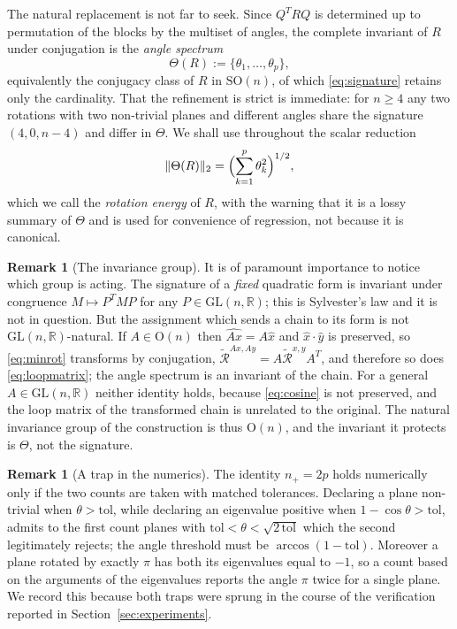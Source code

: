 \documentclass{article}
\theoremstyle{plain}
\theoremstyle{definition}
\newtheorem{remark}[theorem]{Remark}
\numberwithin{equation}{section}
\newcommand{\R}{\mathbb{R}}
\newcommand{\SO}{\mathrm{SO}}
\newcommand{\Ort}{\mathrm{O}}
\newcommand{\Rmin}{\widetilde{\mathcal{R}}}
\begin{document}
The natural replacement is not far to seek. Since $Q^T R Q$ is
determined up to permutation of the blocks by the multiset of angles,
the complete invariant of $R$ under conjugation is the \emph{angle
spectrum}
\begin{equation}\label{eq:anglespectrum}
\Theta(R) := \{\theta_1,\dots,\theta_p\},
\end{equation}
equivalently the conjugacy class of $R$ in $\SO(n)$, of which
\eqref{eq:signature} retains only the cardinality. That the refinement
is strict is immediate: for $n \ge 4$ any two rotations with two
non-trivial planes and different angles share the signature
$(4,0,n-4)$ and differ in $\Theta$. We shall use throughout the scalar
reduction
\begin{equation}\label{eq:energy}
\|\Theta(R)\|_2 = \Bigl(\sum_{k=1}^{p}\theta_k^2\Bigr)^{1/2},
\end{equation}
which we call the \emph{rotation energy} of $R$, with the warning that
it is a lossy summary of $\Theta$ and is used for convenience of
regression, not because it is canonical.

\begin{remark}[The invariance group]\label{rem:group}
It is of paramount importance to notice which group is acting. The
signature of a \emph{fixed} quadratic form is invariant under congruence
$M \mapsto P^T M P$ for any $P \in \mathrm{GL}(n,\R)$; this is
Sylvester's law and it is not in question. But the assignment which
sends a chain to its form is not $\mathrm{GL}(n,\R)$-natural. If
$A \in \Ort(n)$ then $\widehat{Ax} = A\hat{x}$ and
$\hat{x}\cdot\hat{y}$ is preserved, so \eqref{eq:minrot} transforms by
conjugation, $\Rmin^{Ax,Ay} = A \Rmin^{x,y} A^T$, and therefore so does
\eqref{eq:loopmatrix}; the angle spectrum is an invariant of the chain.
For a general $A \in \mathrm{GL}(n,\R)$ neither identity holds, because
\eqref{eq:cosine} is not preserved, and the loop matrix of the
transformed chain is unrelated to the original. The natural invariance
group of the construction is thus $\Ort(n)$, and the invariant it
protects is $\Theta$, not the signature.
\end{remark}

\begin{remark}[A trap in the numerics]\label{rem:tolerance}
The identity $n_+ = 2p$ holds numerically only if the two counts are
taken with matched tolerances. Declaring a plane non-trivial when
$\theta > \mathrm{tol}$, while declaring an eigenvalue positive when
$1-\cos\theta > \mathrm{tol}$, admits to the first count planes with
$\mathrm{tol} < \theta < \sqrt{2\,\mathrm{tol}}$ which the second
legitimately rejects; the angle threshold must be
$\arccos(1-\mathrm{tol})$. Moreover a plane rotated by exactly $\pi$ has
both its eigenvalues equal to $-1$, so a count based on the arguments of
the eigenvalues reports the angle $\pi$ twice for a single plane. We
record this because both traps were sprung in the course of the
verification reported in Section~\ref{sec:experiments}.
\end{remark}
\end{document}
